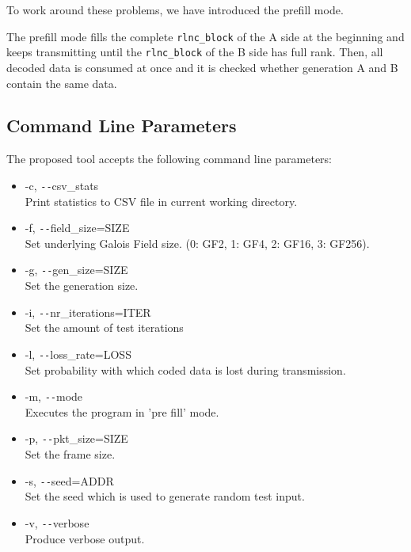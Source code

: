 \documentclass[a4paper,english,10pt]{tumarticle}
\begin{document}
To work around these problems, we have introduced the prefill mode.

The prefill mode fills the complete \texttt{rlnc\_block} of the A side at the beginning and keeps transmitting until the 
\texttt{rlnc\_block} of the B side has full rank. Then, all decoded data is consumed at once and it is checked 
whether generation A and B contain the same data.

\subsection{Command Line Parameters}\label{app:cmd}
The proposed tool accepts the following command line parameters:

\begin{itemize}
    \item -c, \texttt{-{}-}csv\_stats\\
    Print statistics to CSV file in current working directory.

    \item -f, \texttt{-{}-}field\_size=SIZE\\
    Set underlying Galois Field size. (0: GF2, 1: GF4, 2: GF16, 3: GF256).

    \item -g, \texttt{-{}-}gen\_size=SIZE\\
    Set the generation size.

    \item -i, \texttt{-{}-}nr\_iterations=ITER\\
    Set the amount of test iterations

    \item -l, \texttt{-{}-}loss\_rate=LOSS\\
    Set probability with which coded data is lost during transmission.

    \item -m, \texttt{-{}-}mode\\
    Executes the program in 'pre fill' mode.

    \item -p, \texttt{-{}-}pkt\_size=SIZE\\
    Set the frame size.

    \item -s, \texttt{-{}-}seed=ADDR\\
    Set the seed which is used to generate random test input.

    \item -v, \texttt{-{}-}verbose\\
    Produce verbose output.
\end{itemize}
\end{document}
